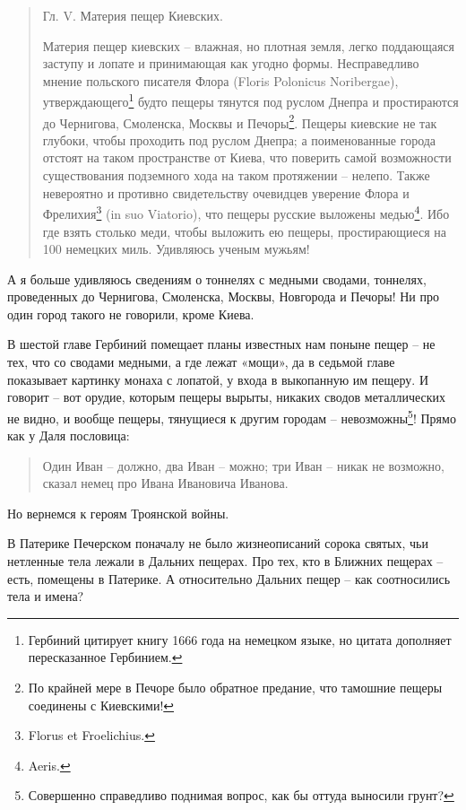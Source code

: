 \begin{quotation}
Гл. V. Материя пещер Киевских.

Материя пещер киевских – влажная, но плотная земля, легко поддающаяся заступу и лопате и принимающая как угодно формы. Несправедливо мнение польского писателя Флора (Flor\-is Polonicus Noribergae), утверждающего\footnote{Гербиний цитирует книгу 1666 года на немецком языке, но цитата дополняет пересказанное Гербинием.} будто пещеры тянутся под руслом Днепра и простираются до Чернигова, Смоленска, Москвы и Печоры\footnote{По крайней мере в Печоре было обратное предание, что тамошние пещеры  соединены с Киевскими!}. Пещеры киевские не так глубоки, чтобы проходить под руслом Днепра; а поименованные города отстоят на таком пространстве от Киева, что поверить самой возможности существования подземного хода на таком протяжении – нелепо. Также невероятно и противно свидетельству очевидцев уверение Флора и Фрелихия\footnote{Florus et Froelichius.} (in suo Viatorio), что пещеры русские выложены медью\footnote{Aeris.}. Ибо где взять столько меди, чтобы выложить ею пещеры, простирающиеся на 100 немецких миль. Удивляюсь ученым мужьям!
\end{quotation}

А я больше удивляюсь сведениям о тоннелях с медными сводами, тоннелях, проведенных до Чернигова, Смоленска, Москвы, Новгорода и Печоры! Ни про один город такого не говорили, кроме Киева.

В шестой главе Гербиний помещает планы известных нам поныне пещер – не тех, что со сводами медными, а где лежат «мощи», да в седьмой главе показывает картинку монаха с лопатой, у входа в выкопанную им пещеру. И говорит – вот орудие, которым пещеры вырыты, никаких сводов металлических не видно, и вообще пещеры, тянущиеся к другим городам – невозможны\footnote{Совершенно справедливо поднимая вопрос, как бы оттуда выносили грунт?}! Прямо как у Даля пословица:

\begin{quotation}
Один Иван – должно, два Иван – можно; три Иван – никак не возможно, сказал немец про Ивана Ивановича Иванова.
\end{quotation}
 
Но вернемся к героям Троянской войны.

В Патерике Печерском поначалу не было жизнеописаний сорока святых, чьи нетленные тела лежали в Дальних пещерах. Про тех, кто в Ближних пещерах – есть, помещены в Патерике. А относительно Дальних пещер – как соотносились тела и имена? 

